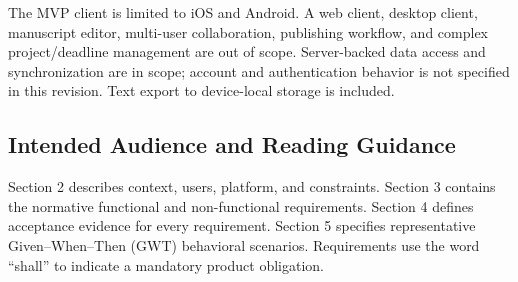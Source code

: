 \documentclass[11pt,a4paper]{article}
\begin{document}
The MVP client is limited to iOS and Android. A web client, desktop client, manuscript editor, multi-user collaboration, publishing workflow, and complex project/deadline management are out of scope. Server-backed data access and synchronization are in scope; account and authentication behavior is not specified in this revision. Text export to device-local storage is included.

\subsection{Intended Audience and Reading Guidance}
Section 2 describes context, users, platform, and constraints. Section 3 contains the normative functional and non-functional requirements. Section 4 defines acceptance evidence for every requirement. Section 5 specifies representative Given--When--Then (GWT) behavioral scenarios. Requirements use the word ``shall'' to indicate a mandatory product obligation.
\end{document}
